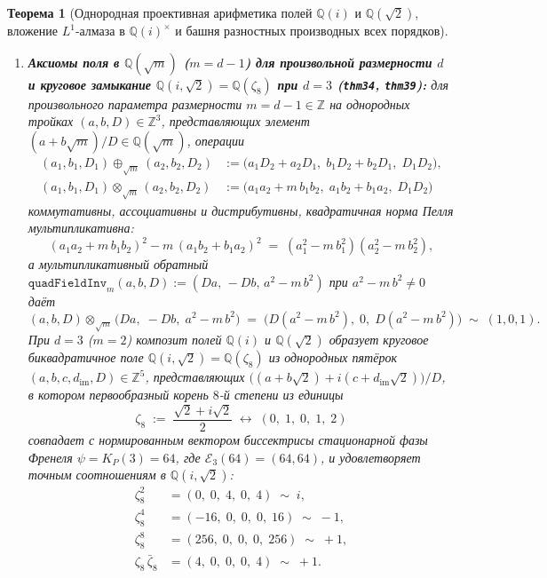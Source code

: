 \documentclass[11pt,a4paper]{article}
\theoremstyle{plain}
\newtheorem{theorem}{Теорема}[section]
\theoremstyle{definition}
\begin{document}
\begin{theorem}[Однородная проективная арифметика полей $\mathbb{Q}(i)$ и $\mathbb{Q}(\sqrt{2})$, вложение $L^1$-алмаза в $\mathbb{Q}(i)^\times$ и башня разностных производных всех порядков]
\begin{enumerate}[label=\textbf{(\roman*)},leftmargin=*]
\item \textbf{Аксиомы поля в $\mathbb{Q}(\sqrt{m})$ ($m = d - 1$) для произвольной размерности $d$ и круговое замыкание $\mathbb{Q}(i, \sqrt{2}) = \mathbb{Q}(\zeta_8)$ при $d = 3$ (\texttt{thm34}, \texttt{thm39}):}
  для произвольного параметра размерности $m = d - 1 \in \mathbb{Z}$ на однородных тройках $(a, b, D) \in \mathbb{Z}^3$, представляющих элемент $(a + b\sqrt{m})/D \in \mathbb{Q}(\sqrt{m})$, операции
  \begin{align}
    (a_1, b_1, D_1) \oplus_{\sqrt{m}} (a_2, b_2, D_2) &:= \bigl(a_1 D_2 + a_2 D_1,\; b_1 D_2 + b_2 D_1,\; D_1 D_2\bigr), \label{eq:sqrt2-field-add} \\
    (a_1, b_1, D_1) \otimes_{\sqrt{m}} (a_2, b_2, D_2) &:= \bigl(a_1 a_2 + m\,b_1 b_2,\; a_1 b_2 + b_1 a_2,\; D_1 D_2\bigr) \label{eq:sqrt2-field-mul}
  \end{align}
  коммутативны, ассоциативны и дистрибутивны, квадратичная норма Пелля мультипликативна:
  \begin{equation}
    \label{eq:pell-norm-mult}
    (a_1 a_2 + m\,b_1 b_2)^2 - m\,(a_1 b_2 + b_1 a_2)^2 \;=\; (a_1^2 - m\,b_1^2)(a_2^2 - m\,b_2^2),
  \end{equation}
  а мультипликативный обратный $\texttt{quadFieldInv}_m(a, b, D) := (Da,\, -Db,\, a^2 - m\,b^2)$ при $a^2 - m\,b^2 \ne 0$ даёт
  \begin{equation}
    \label{eq:sqrt2-field-inverse}
    (a, b, D) \otimes_{\sqrt{m}} \bigl(Da,\; -Db,\; a^2 - m\,b^2\bigr) \;=\; \bigl(D(a^2 - m\,b^2),\; 0,\; D(a^2 - m\,b^2)\bigr) \;\sim\; (1, 0, 1).
  \end{equation}
  При $d = 3$ ($m = 2$) композит полей $\mathbb{Q}(i)$ и $\mathbb{Q}(\sqrt{2})$ образует круговое биквадратичное поле $\mathbb{Q}(i, \sqrt{2}) = \mathbb{Q}(\zeta_8)$ из однородных пятёрок $(a, b, c, d_{\mathrm{im}}, D) \in \mathbb{Z}^5$, представляющих $\bigl((a + b\sqrt{2}) + i(c + d_{\mathrm{im}}\sqrt{2})\bigr)/D$, в котором первообразный корень $8$-й степени из единицы
  \begin{equation}
    \label{eq:zeta8-def}
    \zeta_8 \;:=\; \frac{\sqrt{2} + i\sqrt{2}}{2} \;\longleftrightarrow\; (0,\; 1,\; 0,\; 1,\; 2)
  \end{equation}
  совпадает с нормированным вектором биссектрисы стационарной фазы Френеля $\psi = K_P(3) = 64$, где $\mathcal{E}_3(64) = (64, 64)$, и удовлетворяет точным соотношениям в $\mathbb{Q}(i, \sqrt{2})$:
  \begin{align}
    \zeta_8^2 &= (0,\; 0,\; 4,\; 0,\; 4) \;\sim\; i, \label{eq:zeta8-sq} \\
    \zeta_8^4 &= (-16,\; 0,\; 0,\; 0,\; 16) \;\sim\; -1, \label{eq:zeta8-pow4} \\
    \zeta_8^8 &= (256,\; 0,\; 0,\; 0,\; 256) \;\sim\; +1, \label{eq:zeta8-pow8} \\
    \zeta_8\,\bar{\zeta}_8 &= (4,\; 0,\; 0,\; 0,\; 4) \;\sim\; +1. \label{eq:zeta8-norm}
  \end{align}


\end{enumerate}
\end{theorem}
\end{document}
